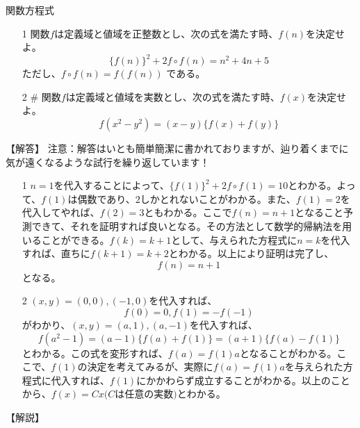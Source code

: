 \documentclass[a4paper,fleqn,dvipdfmx]{jsarticle}
\begin{document}
\newpage

\begin{itembox}[l]{関数方程式}

\begin{itemize}
    \item [1] 
        関数$f$は定義域と値域を正整数とし、次の式を満たす時、$f(n)$を決定せよ。
        $$\{f(n)\}^2+2f\circ f(n)=n^2+4n+5$$
        ただし、$f\circ f(n)=f(f(n))$ である。
    
    \item [2] \#
    関数$f$は定義域と値域を実数とし、次の式を満たす時、$f(x)$を決定せよ。
    $$f(x^2-y^2)=(x-y)\{f(x)+f(y)\}$$
\end{itemize}
\end{itembox}


\begin{flushleft}
【解答】
注意：解答はいとも簡単簡潔に書かれておりますが、辿り着くまでに気が遠くなるような試行を繰り返しています！
\end{flushleft}

\begin{itemize}
    \item [1] 
    $n=1$を代入することによって、$\{f(1)\}^2+2f\circ f(1)=10$とわかる。よって、$f(1)$は偶数であり、$2$しかとれないことがわかる。また、$f(1)=2$を代入してやれば、$f(2)=3$ともわかる。ここで$f(n)=n+1$となること予測できて、それを証明すれば良いとなる。その方法として数学的帰納法を用いることができる。$f(k)=k+1$として、与えられた方程式に$n=k$を代入すれば、直ちに$f(k+1)=k+2$とわかる。以上により証明は完了し、$$f(n)=n+1$$となる。
    
    \item [2]
    $(x,y)=(0,0),(-1,0)$を代入すれば、
    $$f(0)=0,f(1)=-f(-1)$$
    がわかり、$(x,y)=(a,1),(a,-1)$を代入すれば、
    $$f(a^2-1)=(a-1)\{f(a)+f(1)\}=(a+1)\{f(a)-f(1)\}$$
    とわかる。この式を変形すれば、$f(a)=f(1)a$となることがわかる。ここで、$f(1)$の決定を考えてみるが、実際に$f(a)=f(1)a$を与えられた方程式に代入すれば、$f(1)$にかかわらず成立することがわかる。以上のことから、$f(x)=Cx(C$は任意の実数$)$とわかる。
    
\end{itemize}


\begin{flushleft}
【解説】
\end{flushleft}
\end{document}
